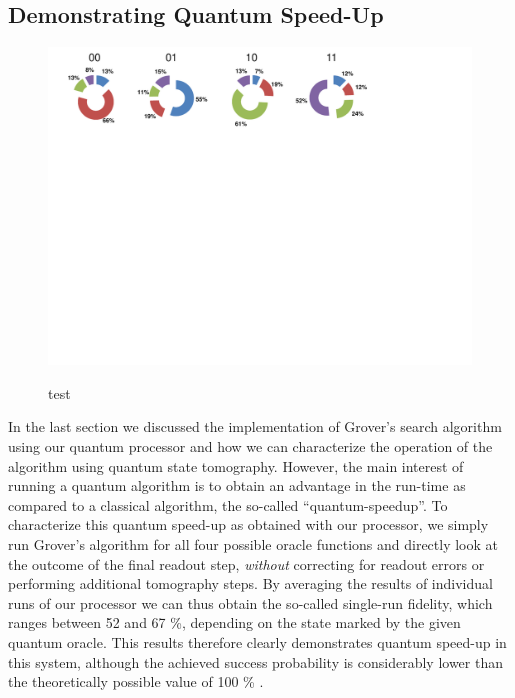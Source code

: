\subsection{Demonstrating Quantum Speed-Up}

\begin{figure}[ht!]
		\centering
		\includegraphics[width=1.0\textwidth]{./material/papers/grover/figures/grover_algorithm_single_shot_probabilities}
	\label{fig:GroverSingleShotProbabilities}
	\caption{test}
\end{figure}

In the last section we discussed the implementation of Grover's search algorithm using our quantum processor and how we can characterize the operation of the algorithm using quantum state tomography. However, the main interest of running a quantum algorithm is to obtain an advantage in the run-time as compared to a classical algorithm, the so-called ``quantum-speedup''. To characterize this quantum speed-up as obtained with our processor, we simply run Grover's algorithm for all four possible oracle functions and directly look at the outcome of the final readout step, \textit{without} correcting for readout errors or performing additional tomography steps. By averaging the results of individual runs of our processor we can thus obtain the so-called single-run fidelity, which ranges between 52 and 67 \%, depending on the state marked by the given quantum oracle. This results therefore clearly demonstrates quantum speed-up in this system, although the achieved success probability is considerably lower than the theoretically possible value of 100 \% .

